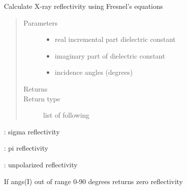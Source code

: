 \documentclass[letterpaper,10pt,english]{sphinxmanual}
\begin{document}

\begin{fulllineitems}
\label{\detokenize{xscat_functions:xscat.xfresnel}}
Calculate X-ray reflectivity using Fresnel’s equations
\begin{quote}\begin{description}
\item[{Parameters}] \leavevmode\begin{itemize}
\item {} 
 \textendash{} real incremental part dielectric constant

\item {} 
 \textendash{} imaginary part of dielectric constant

\item {} 
 \textendash{} incidence angles (degrees)

\end{itemize}

\item[{Returns}] \leavevmode


\item[{Return type}] \leavevmode
list of following

\end{description}\end{quote}

\begin{DUlineblock}{0em}
\item[] :       sigma reflectivity
\item[] :       pi reflectivity
\item[] :     unpolarized reflectivity
\end{DUlineblock}

If angs(I) out of range 0-90 degrees returns zero reflectivity

\end{fulllineitems}

\end{document}
